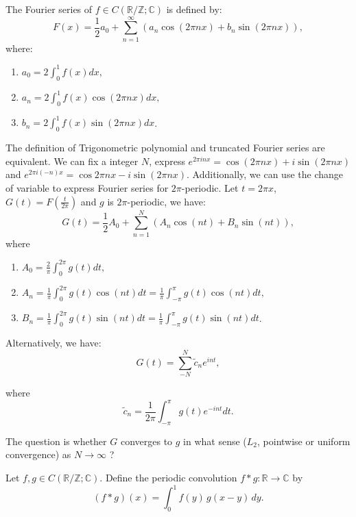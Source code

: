 \documentclass[12pt]{article}
\begin{document}
\begin{definition}
 The Fourier series of $f\in C(\mathbb{R}/\mathbb{Z}; \mathbb{C})$ is defined by:
 \[
  F(x)=\frac{1}{2}a_0 + \sum_{n=1}^{\infty} \left(a_n \cos(2\pi nx)+b_n \sin(2\pi nx)\right),
 \] 
 where:
 \begin{enumerate}
    \item $a_0=2\int_{0}^{1}f(x)dx,$
    \item $a_n=2\int_{0}^{1}f(x)\cos(2\pi nx)dx,$
    \item $b_n=2\int_{0}^{1}f(x)\sin(2\pi nx)dx$.
 \end{enumerate}
\end{definition}

\begin{remark}
 The definition of Trigonometric polynomial and truncated Fourier series are equivalent.
 We can fix a integer $N$, express $e^{2\pi inx}=\cos(2\pi nx)+i\sin(2\pi nx)$ and $e^{2\pi i(-n)x} = \cos{2\pi nx}-i\sin(2\pi nx)$.
 Additionally, we can use the change of variable to express Fourier series for $2\pi$-periodic.
 Let $t=2\pi x$, $G(t)=F(\frac{t}{2\pi})$ and $g$ is $2\pi$-periodic, we have:
 \[
  G(t)=\frac{1}{2}A_0 + \sum_{n=1}^{N} \left(A_n \cos(nt)+B_n \sin(nt)\right),
 \] 
 where
 \begin{enumerate}
    \item $A_0=\frac{2}{\pi}\int_{0}^{2\pi}g(t)dt,$
    \item $A_n=\frac{1}{\pi}\int_{0}^{2\pi}g(t)\cos(nt)dt = \frac{1}{\pi}\int_{-\pi}^{\pi}g(t)\cos(nt)dt,$
    \item $B_n=\frac{1}{\pi}\int_{0}^{2\pi}g(t)\sin(nt)dt = \frac{1}{\pi}\int_{-\pi}^{\pi}g(t)\sin(nt)dt$.
 \end{enumerate}

 Alternatively, we have:
 \[G(t) = \sum_{-N}^{N} \tilde{c}_n e^{int},\]
 
where 
\[\tilde{c}_n = \frac{1}{2\pi}\int_{-\pi}^{\pi}g(t) e^{-int}dt.\]

The question is whether $G$ converges to $g$ in what sense ($L_2$, pointwise or uniform convergence) as $N\rightarrow\infty$ ?
\end{remark}


\begin{definition}
Let $f,g\in C(\mathbb{R}/\mathbb{Z}; \mathbb{C})$. 
Define the periodic convolution $f*g:\mathbb{R}\rightarrow\mathbb{C}$ by
\[
(f * g)(x) = \int_{0}^{1} f(y)\, g(x-y)\, dy.
\]
\end{definition}
\end{document}
